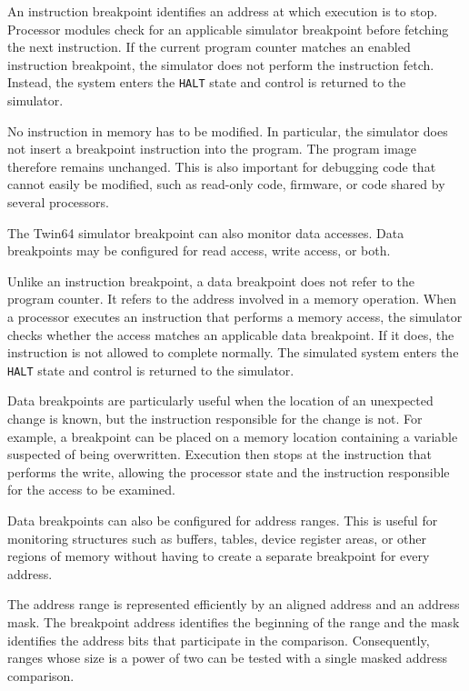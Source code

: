 
An instruction breakpoint identifies an address at which execution is to stop. Processor modules check for an applicable simulator breakpoint before fetching the next instruction. If the current program counter matches an enabled instruction breakpoint, the simulator does not perform the instruction fetch. Instead, the system enters the \texttt{HALT} state and control is returned to the simulator.

No instruction in memory has to be modified. In particular, the simulator does not insert a breakpoint instruction into the program. The program image therefore remains unchanged.
This is also important for debugging code that cannot easily be modified, such as read-only code, firmware, or code shared by several processors.


The Twin64 simulator breakpoint can also monitor data accesses. Data breakpoints may be configured for read access, write access, or both.

Unlike an instruction breakpoint, a data breakpoint does not refer to the program counter. It refers to the address involved in a memory operation. When a processor executes an instruction that performs a memory access, the simulator checks whether the access matches an applicable data breakpoint. If it does, the instruction is not allowed to complete normally. The simulated system enters the \texttt{HALT} state and control is returned to the simulator.

Data breakpoints are particularly useful when the location of an unexpected change is known, but the instruction responsible for the change is not. For example, a breakpoint can be placed on a memory location containing a variable suspected of being overwritten. Execution then stops at the instruction that performs the write, allowing the processor state and the instruction responsible for the access to be examined.

Data breakpoints can also be configured for address ranges. This is useful for monitoring structures such as buffers, tables, device register areas, or other regions of memory without having to create a separate breakpoint for every address.

The address range is represented efficiently by an aligned address and an address mask. The breakpoint address identifies the beginning of the range and the mask identifies the address bits that participate in the comparison. Consequently, ranges whose size is a power of two can be tested with a single masked address comparison.

